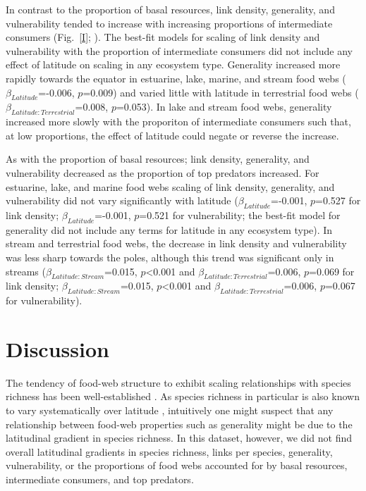 \documentclass[12pt]{article}
\begin{document}
In contrast to the proportion of basal resources, link density, generality,
and vulnerability tended to increase with increasing proportions of
intermediate consumers (Fig.~\ref{I}; ). The best-fit models for scaling of link
density and vulnerability with the proportion of intermediate consumers did
not include any effect of latitude on scaling in any ecosystem type. Generality
increased more rapidly towards the equator in estuarine, lake, marine, and
stream food webs ($\beta_{Latitude}$=-0.006, $p$=0.009) and varied little with
latitude in terrestrial food webs ($\beta_{Latitude:Terrestrial}$=0.008,
$p$=0.053). In lake and stream food webs, generality increased more slowly
with the proporiton of intermediate consumers such that, at low proportions,
the effect of latitude could negate or reverse the increase.


As with the proportion of basal resources; link density, generality, and
vulnerability decreased as the proportion of top predators increased. For
estuarine, lake, and marine food webs scaling of link density, generality, and
vulnerability did not vary significantly with latitude
($\beta_{Latitude}$=-0.001, $p$=0.527 for link density;
$\beta_{Latitude}$=-0.001, $p$=0.521 for vulnerability; the best-fit model for
generality did not include any terms for latitude in any ecosystem type). In
stream and terrestrial food webs, the decrease in link density and
vulnerability was less sharp towards the poles, although this trend was
significant only in streams ($\beta_{Latitude:Stream}$=0.015,
$p$\textless0.001 and $\beta_{Latitude:Terrestrial}$=0.006, $p$=0.069 for link
density; $\beta_{Latitude:Stream}$=0.015, $p$\textless0.001 and
$\beta_{Latitude:Terrestrial}$=0.006, $p$=0.067 for vulnerability).



\section*{Discussion}

The tendency of food-web structure to exhibit scaling relationships with
species richness has been well-established \citep{Dunne2004,Riede2010}. As
species richness in particular is also known to vary systematically over
latitude \citep{}, intuitively one might suspect that any relationship
between food-web properties such as generality might be due to the latitudinal
gradient in species richness. In this dataset, however, we did not find
overall latitudinal gradients in species richness, links per species, 
generality, vulnerability, or the proportions of food webs accounted for by 
basal resources, intermediate consumers, and top predators. 
\end{document}
